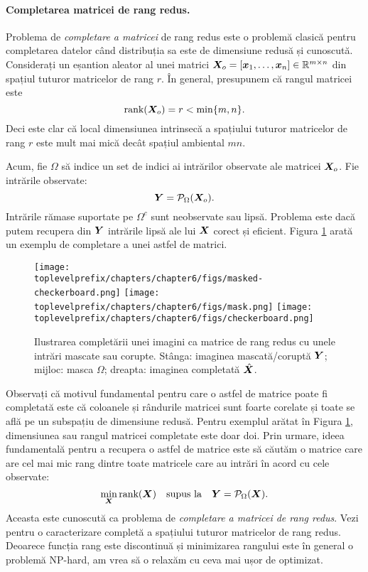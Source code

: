 \documentclass[../../book-main_ro.tex]{subfiles}
\begin{document}
\paragraph{Completarea matricei de rang redus.}  
Problema de {\em completare a matricei} de rang redus este o problemă clasică pentru completarea datelor când distribuția sa este de dimensiune redusă și cunoscută. Considerați un eșantion aleator al unei matrici $\bm{X}_o =
[\bm{x}_1, \ldots, \bm{x}_n] \in \mathbb{R}^{m\times n}$ din spațiul tuturor matricelor de rang $r$. În general, presupunem că rangul
matricei este
\begin{equation}
\mbox{rank}(\bm{X}_o) = r < \min\{m, n\}.
\end{equation}
Deci este clar că local dimensiunea intrinsecă a spațiului tuturor matricelor de rang $r$ este mult mai mică decât spațiul ambiental $mn$.

Acum, fie $\Omega$ să indice un set de indici ai intrărilor observate ale matricei $\bm{X}_o$. Fie intrările observate:
\begin{equation}
\bm{Y} = \mathcal{P}_{\Omega}(\bm{X}_o).
\end{equation}
Intrările rămase suportate pe $\Omega^c$ sunt neobservate sau
lipsă. Problema este dacă putem recupera din $\bm{Y}$ intrările lipsă
ale lui $\bm{X}$ corect și eficient. Figura \ref{fig:matrix-completion} arată un
exemplu de completare a unei astfel de matrici.

\begin{figure}
\centering
\texttt{[image: \\toplevelprefix/chapters/chapter6/figs/masked-checkerboard.png]}\;\;
\texttt{[image: \\toplevelprefix/chapters/chapter6/figs/mask.png]}\;\;
\texttt{[image: \\toplevelprefix/chapters/chapter6/figs/checkerboard.png]}
\caption{Ilustrarea completării unei imagini ca matrice de rang redus
  cu unele intrări mascate sau corupte. Stânga: imaginea mascată/coruptă
$\bm{Y}$; mijloc: masca $\Omega$; dreapta: imaginea completată $\hat {\bm{X}}$.}
\label{fig:matrix-completion}
\end{figure}

Observați că motivul fundamental pentru care o astfel de matrice poate fi completată este că coloanele și rândurile matricei sunt foarte corelate și
toate se află pe un subspațiu de dimensiune redusă. Pentru exemplul arătat în
Figura \ref{fig:matrix-completion}, dimensiunea sau rangul matricei completate este doar doi. Prin urmare, ideea fundamentală pentru a recupera o astfel de matrice este să căutăm o matrice care are cel mai mic rang dintre toate
matricele care au intrări în acord cu cele observate:
\begin{equation}
\min_{\bm{X}} \mbox{rank}(\bm{X}) \quad \mbox{supus la}
\quad
\bm{Y} = \mathcal{P}_{\Omega}(\bm{X}).
\label{eqn:rank-min}
\end{equation}
Aceasta este cunoscută ca problema de {\em completare a matricei de rang redus}. Vezi \cite{Wright-Ma-2022} pentru o caracterizare completă a spațiului tuturor matricelor de rang redus. Deoarece funcția rang este discontinuă și minimizarea rangului
este în general o problemă NP-hard, am vrea să o relaxăm cu
ceva mai ușor de optimizat.
\end{document}
